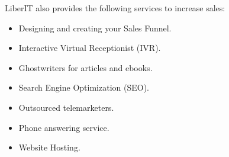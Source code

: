 \documentclass[12pt]{article}
\begin{document}
LiberIT also provides the following services to increase sales:
\begin{itemize}
  \item Designing and creating your Sales Funnel. 
  \item Interactive Virtual Receptionist (IVR). 
  \item Ghostwriters for articles and ebooks.
  \item Search Engine Optimization (SEO).
  \item Outsourced telemarketers. 
  \item Phone answering service. 
  \item Website Hosting.
\end{itemize}


\end{document}
